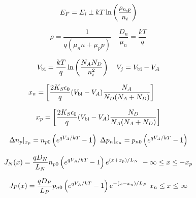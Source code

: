 {\begin{multicols}{2}
	\begin{Formulario}
		\begin{equation*}
			E_F = E_i \pm kT \ln \left( \frac{\rho_{n,p}}{n_i} \right)
		\end{equation*}
	\end{Formulario}
	\begin{Formulario}
		\begin{equation*}
			\rho = \frac{1}{q(\mu_n n + \mu_p p)} \quad 
			\frac{D_n}{\mu_n} = \frac{kT}{q}
		\end{equation*}
	\end{Formulario}
	\begin{Formulario}
		\begin{equation*}
			V_{\text{bi}}= \frac{kT}{q} \ln \left( \frac{N_AN_D}{n_i^2} \right) \quad 
			V_j = V_{\text{bi}} - V_A
		\end{equation*}
	\end{Formulario}
	\begin{Formulario}
		\begin{equation*}
			x_n = \left[ \frac{2K_S\epsilon_0 }{q} (V_{\text{bi}} - V_A) \frac{N_A}{N_D(N_A+N_D)} \right] \qquad
		\end{equation*}
	\end{Formulario}
	\begin{Formulario}
		\begin{equation*}
			x_p = \left[ \frac{2K_S\epsilon_0 }{q} (V_{\text{bi}} - V_A) \frac{N_D}{N_A(N_A+N_D)} \right]
		\end{equation*}
	\end{Formulario}
	\begin{Formulario}
		\begin{equation*}
			\Delta n_p |_{x_p} =  n_{p0} \parentesis{ e^{qV_A/kT}  -1} \ 
			\Delta p_n |_{x_n} = p_{n0} \parentesis{ e^{qV_A/kT}  -1}
		\end{equation*}
	\end{Formulario}
	\begin{Formulario}
		\begin{equation*}
			J_N (x) = \frac{qD_N}{L_N} n_{p0} \left( e^{qV_A/kT}-1 \right) e^{(x+x_p)/L_N} \  -\infty \leq x \leq -x_p
		\end{equation*}
	\end{Formulario}
	\begin{Formulario}
		\begin{equation*}
			J_P (x) = \frac{qD_P}{L_P} p_{n0} \left( e^{qV_A/kT}-1 \right) e^{-(x-x_n)/L_P} \  x_n \leq x \leq \infty
		\end{equation*}
	\end{Formulario}

\end{multicols}}

